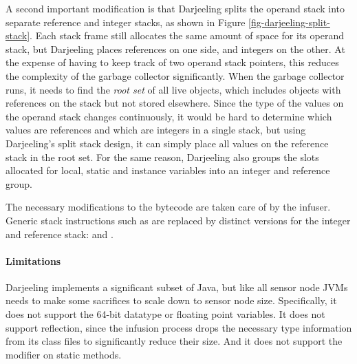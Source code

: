 A second important modification is that Darjeeling splits the operand stack into separate reference and integer stacks, as shown in Figure \ref{fig-darjeeling-split-stack}. Each stack frame still allocates the same amount of space for its operand stack, but Darjeeling places references on one side, and integers on the other. At the expense of having to keep track of two operand stack pointers, this reduces the complexity of the garbage collector significantly. When the garbage collector runs, it needs to find the \emph{root set} of all live objects, which includes objects with references on the stack but not stored elsewhere. Since the type of the values on the operand stack changes continuously, it would be hard to determine which values are references and which are integers in a single stack, but using Darjeeling's split stack design, it can simply place all values on the reference stack in the root set. For the same reason, Darjeeling also groups the slots allocated for local, static and instance variables into an integer and reference group.

The necessary modifications to the bytecode are taken care of by the infuser. Generic stack instructions such as  are replaced by distinct versions for the integer and reference stack:  and .

\paragraph{Limitations}
Darjeeling implements a significant subset of Java, but like all sensor node JVMs needs to make some sacrifices to scale down to sensor node size. Specifically, it does not support the 64-bit  datatype or floating point variables. It does not support reflection, since the infusion process drops the necessary type information from its class files to significantly reduce their size. And it does not support the  modifier on static methods.

